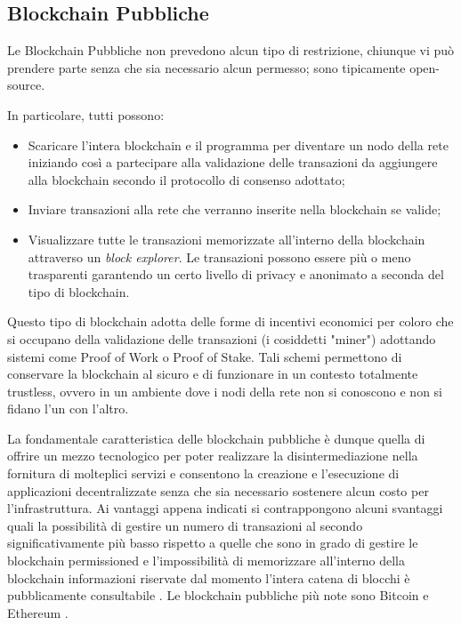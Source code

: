 \subsection{Blockchain Pubbliche}
Le Blockchain Pubbliche non prevedono alcun tipo di restrizione, chiunque vi può prendere parte senza che sia necessario alcun permesso; sono tipicamente open-source.

In particolare, tutti possono:
\begin{itemize}
  \item Scaricare l'intera blockchain e il programma per diventare un nodo della rete iniziando così a partecipare alla validazione delle transazioni da aggiungere alla blockchain secondo il protocollo di consenso adottato;
  \item Inviare transazioni alla rete che verranno inserite nella blockchain se valide;
  \item Visualizzare tutte le transazioni memorizzate all'interno della blockchain attraverso un \textit{block explorer}. Le transazioni possono essere più o meno trasparenti garantendo un certo livello di privacy e anonimato a seconda del tipo di blockchain.
\end{itemize}

Questo tipo di blockchain adotta delle forme di incentivi economici per coloro che si occupano della validazione delle transazioni (i cosiddetti "miner") adottando sistemi come Proof of Work o Proof of Stake. Tali schemi permettono di conservare la blockchain al sicuro e di funzionare in un contesto totalmente trustless, ovvero in un ambiente dove i nodi della rete non si conoscono e non si fidano l'un con l'altro. 

La fondamentale caratteristica delle blockchain pubbliche è dunque quella di offrire un mezzo tecnologico per poter realizzare la disintermediazione nella fornitura di molteplici servizi e consentono la creazione e l'esecuzione di applicazioni decentralizzate senza che sia necessario sostenere alcun costo per l'infrastruttura. Ai vantaggi appena indicati si contrappongono alcuni svantaggi quali la possibilità di gestire un numero di transazioni al secondo significativamente più basso rispetto a quelle che sono in grado di gestire le blockchain permissioned e l'impossibilità di memorizzare all'interno della blockchain informazioni riservate dal momento l'intera catena di blocchi è pubblicamente consultabile \cite{vukolic2015quest}. Le blockchain pubbliche più note sono Bitcoin \cite{nakamoto2008bitcoin} e Ethereum \cite{yafimava_2019}.

